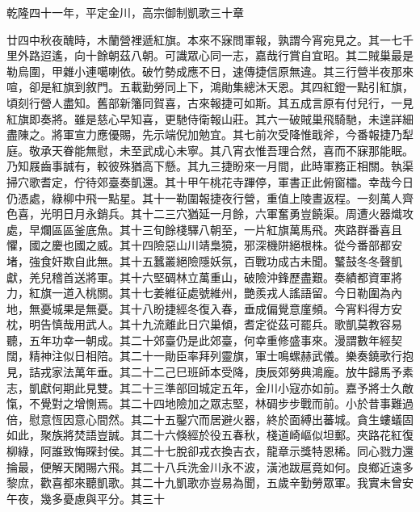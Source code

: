 \begin{pinyinscope}
乾隆四十一年，平定金川，高宗御制凱歌三十章

廿四中秋夜醜時，木蘭營裡遞紅旗。本來不寐問軍報，孰謂今宵宛見之。其一七千里外路迢遙，向十餘朝茲八朝。可識眾心同一志，嘉哉行賞自宜昭。其二賊巢最是勒烏圍，甲雜小連噶喇依。破竹勢成應不日，速傳捷信原無違。其三行營半夜那來喧，卻是紅旗到敘門。五載勤勞同上下，鴻勛集總沐天恩。其四紅鐙一點引紅旗，頃刻行營人盡知。舊部新籓同賀喜，古來報捷可如斯。其五成言原有付兒行，一見紅旗即奏將。雖是慈心早知喜，更馳侍衛報山莊。其六一破賊巢飛騎馳，未遑詳細盡陳之。將軍宣力應優賜，先示端倪加勉宜。其七前次受降惟戢斧，今番報捷乃犁庭。敬承天眷能無慰，未至武成心未寧。其八宵衣惟吾理合然，喜而不寐那能眠。乃知屐齒事誠有，較彼殊猶高下懸。其九三捷盼來一月間，此時軍務正相關。執渠掃穴歌耆定，佇待郊臺奏凱還。其十甲午桃花寺蹕停，軍書正此俯窗櫺。幸哉今日仍憑處，綠柳中飛一點星。其十一勒圍報捷夜行營，重值上陵晝返程。一刻萬人齊色喜，光明日月永銷兵。其十二三穴猶延一月餘，六軍奮勇豈饒渠。周遭火器熾攻處，早爛區區釜底魚。其十三旬餘棧驛八朝至，一片紅旗萬馬飛。夾路群番喜且懼，國之慶也國之威。其十四險惡山川靖梟獍，邪深機阱絕根株。從今番部都安堵，強食奸欺自此無。其十五蠶叢絕險隱妖氛，百戰功成古未聞。鼜鼓冬冬聲凱獻，羌兒稽首送將軍。其十六堅碉林立萬重山，破險沖鋒歷盡艱。奏績都資軍將力，紅旗一道入桃關。其十七姜維征處號維州，艷羨戎人謠語留。今日勒圍為內地，無憂城果是無憂。其十八盼捷經冬復入春，垂成偏覺意廑頻。今宵料得方安枕，明告慎哉用武人。其十九流離此日穴巢傾，耆定從茲可罷兵。歌凱莫教容易聽，五年功幸一朝成。其二十郊臺仍是此郊臺，何幸重修盛事來。漫謂數年經契闊，精神注似日相陪。其二十一勛臣率拜列靈旗，軍士鳴螺赫武儀。樂奏鐃歌行抱見，詰戎家法萬年垂。其二十二己巳班師本受降，庚辰郊勞典鴻龐。放牛歸馬予素志，凱獻何期此見雙。其二十三準部回城定五年，金川小寇亦如前。嘉予將士久敵愾，不覺對之增惻焉。其二十四地險加之眾志堅，林碉步步戰而前。小於昔事難過倍，慰意恆因意心間然。其二十五鑿穴而居避火器，終於面縛出蕃城。貪生螻蟻固如此，聚族將焚語豈誠。其二十六倏經於役五春秋，棧道崎嶇似坦郵。夾路花紅復柳綠，阿誰致悔賝封侯。其二十七脫卻戎衣換吉衣，龍章示獎特恩稀。同心戮力還掄最，便解天閑賜六飛。其二十八兵洗金川永不波，潢池跋扈竟如何。良鄉近遠多黎庶，歡喜都來聽凱歌。其二十九凱歌亦豈易為聞，五歲辛勤勞眾軍。我實未曾安午夜，幾多憂慮與平分。其三十


\end{pinyinscope}
